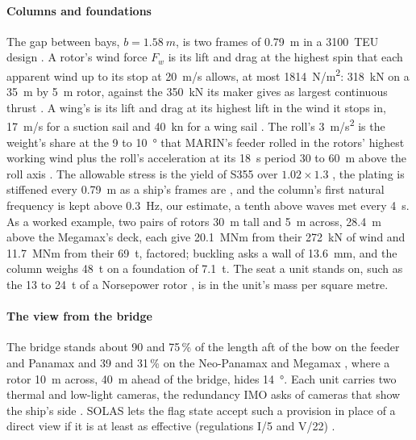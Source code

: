 \paragraph{Columns and foundations} The gap between bays, $b=\SI{1.58}{m}$, is two frames of \SI{0.79}{m} in a \num{3100}~TEU design \citep{souadji2012}. A rotor's wind force $F_w$ is its lift and drag at the highest spin that each apparent wind up to its stop at \SI{20}{m/s} allows, at most \SI{1814}{N/m^2}: \SI{318}{kN} on a \SI{35}{m} by \SI{5}{m} rotor, against the \SI{350}{kN} its maker gives as largest continuous thrust \citep{norsepower2025}. A wing's is its lift and drag at its highest lift in the wind it stops in, \SI{17}{m/s} for a suction sail and \SI{40}{kn} for a wing sail \citep{bar2026windwingscontrol}. The roll's \SI{3}{m/s^2} is the weight's share at the 9 to \SI{10}{\degree} that MARIN's feeder rolled in the rotors' highest working wind plus the roll's acceleration at its \SI{18}{s} period 30 to \SI{60}{m} above the roll axis \citep{marin2025feeder}. The allowable stress is the yield of S355 over $1.02\times1.3$ \citep{constructalia2026s355}, the plating is stiffened every \SI{0.79}{m} as a ship's frames are \citep{souadji2012}, and the column's first natural frequency is kept above \SI{0.3}{Hz}, our estimate, a tenth above waves met every \SI{4}{s}. As a worked example, two pairs of rotors \SI{30}{m} tall and \SI{5}{m} across, \SI{28.4}{m} above the Megamax's deck, each give \SI{20.1}{MNm} from their \SI{272}{kN} of wind and \SI{11.7}{MNm} from their \SI{69}{t}, factored; buckling asks a wall of \SI{13.6}{mm}, and the column weighs \SI{48}{t} on a foundation of \SI{7.1}{t}. The seat a unit stands on, such as the 13 to \SI{24}{t} of a Norsepower rotor \citep[p.~3]{norsepower2025}, is in the unit's mass per square metre.

\paragraph{The view from the bridge} The bridge stands about 90 and 75\,\% of the length aft of the bow on the feeder and Panamax \citep{marreiros2022,souadji2012} and 39 and 31\,\% on the Neo-Panamax and Megamax \citep{wikimedia_mscbeatrice,marreiros2022}, where a rotor \SI{10}{m} across, \SI{40}{m} ahead of the bridge, hides \SI{14}{\degree}. Each unit carries two thermal and low-light cameras, the redundancy IMO asks of cameras that show the ship's side \citep{imo2012circ1350}. SOLAS lets the flag state accept such a provision in place of a direct view if it is at least as effective (regulations I/5 and V/22) \citep{dma2019solas}.

